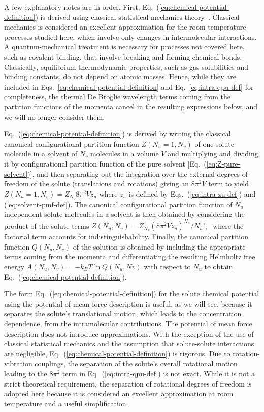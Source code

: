 \documentclass[9pt,bestpractices]{livecoms}
\begin{document}
A few explanatory notes are in order. First, Eq.~(\ref{eq:chemical-potential-definition}) is derived using classical statistical mechanics theory~\cite{hill1986statthermo}. Classical mechanics is considered an excellent approximation for the room temperature processes studied here, which involve only changes in intermolecular interactions. A quantum-mechanical treatment is necessary for processes not covered here, such as covalent binding, that involve breaking and forming chemical bonds. Classically, equilibrium thermodynamic properties, such as gas solubilities and binding constants, do not depend on atomic masses. Hence, while they are included in Eqs.~\ref{eq:chemical-potential-definition} and Eq.~\ref{eq:intra-qpu-def} for completeness, the thermal De Broglie wavelength terms coming from the partition functions of the momenta cancel in the resulting expressions below, and we will no longer consider them.

Eq.~(\ref{eq:chemical-potential-definition}) is derived by writing the classical canonical configurational partition function $Z(N_u = 1, N_v)$ of one solute molecule in a solvent of $N_v$ molecules in a volume $V$ and multiplying and dividing it by configurational partition function of the pure solvent [Eq.~(\ref{eq:Z-pure-solvent})], and then separating out the integration over the external degrees of freedom of the solute (translations and rotations) giving an $8 \pi^2 V$ term to yield $Z(N_u = 1, N_v) = Z_{N_v} 8 \pi^2 V z_u$ where $z_u$ is defined by Eqs.~(\ref{eq:intra-zu-def}) and (\ref{eq:solvent-pmf-def}). The canonical configurational partition function of $N_u$ independent solute molecules in a solvent is then obtained by considering the product of the solute terms $Z(N_u, N_v) = Z_{N_v} (8 \pi^2 V z_u)^{N_u}/N_u!$,~\cite{guggenheim1952mixtures504,simonson2016physical} where the factorial term accounts for indistinguishability. Finally, the canonical partition function $Q(N_u, N_v)$ of the solution is obtained by including the appropriate terms coming from the momenta and differentiating the resulting Helmholtz free energy $A(N_u, N_v) = -k_B T \ln Q(N_u, Nv)$ with respect to $N_u$ to obtain Eq.~(\ref{eq:chemical-potential-definition}).

The form Eq.~(\ref{eq:chemical-potential-definition}) for the solute chemical potential using the potential of mean force description is useful, as we will see, because it separates the solute's translational motion, which leads to the concentration dependence, from the intramolecular contributions. The potential of mean force description does not introduce approximations. With the exception of the use of classical statistical mechanics and the assumption  that solute-solute interactions are negligible, Eq.~(\ref{eq:chemical-potential-definition}) is rigorous. Due to rotation-vibration couplings, the separation of the solute's overall rotational motion leading to the $8 \pi^2$ term in Eq.~(\ref{eq:intra-qpu-def}) is not exact. While it is not a strict theoretical requirement, the separation of rotational degrees of freedom is adopted here because it is considered an excellent approximation at room temperature and a useful simplification.
\end{document}
